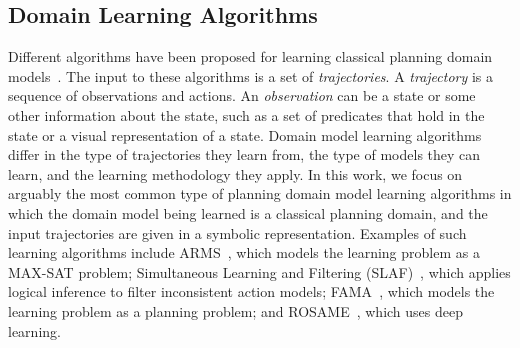 \documentclass[letterpaper]{article} %
\newif\ifaddcomments
\newcommand{\todo}[1]{\ifaddcomments{\textcolor{red}{[TODO: #1]}}\fi}
\newcommand{\roni}[1]{\ifaddcomments{\textcolor{red}{[Roni: #1]}}\fi}
\newcommand{\yarin}[1]{\ifaddcomments{\textcolor{teal}{[Yarin: #1]}}\fi}
\newcommand{\cm}[1]{\ifaddcomments{\textcolor{olive}{[Christian: #1]}}\fi}
\begin{document}
\subsection{Domain Learning Algorithms}
Different algorithms have been proposed for learning classical planning domain models~\citep{macq,aineto2019learning,jimenez2012review}. 
The input to these algorithms is a set of \emph{trajectories}. 
A \emph{trajectory} is a sequence of observations and actions. 
An \emph{observation} can be a state or some other information about the state, 
such as a set of predicates that hold in the state or a visual representation of a state. 
Domain model learning algorithms differ in the type of trajectories they learn from, the type of models they can learn, 
and the learning methodology they apply. 
In this work, we focus on arguably the most common type of planning domain model learning algorithms in which the domain model being learned is a classical planning domain, and the input trajectories are given in a symbolic representation. 
Examples of such learning algorithms include ARMS~\citep{yang2007learning}, which models the learning problem as a MAX-SAT problem; Simultaneous Learning and Filtering (SLAF)~\citep{amir2008learning}, which applies logical inference to filter inconsistent action models; FAMA~\citep{aineto2019learning}, which models the learning problem as a planning problem; and ROSAME~\cite{xi2024neuro}, which uses deep learning. %
\end{document}
